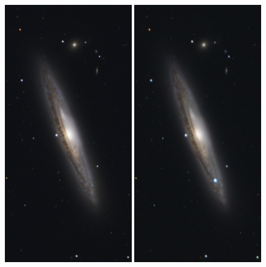 \documentclass[a4paper,oneside,12pt, class=Latex/Classes/PhDthesisPSnPDF, crop=false]{standalone}
\begin{document}
\begin{figure}
    \centering
    \includegraphics[width=0.49\textwidth]{../Images/chapter_1/SN2024gy_pre-SN.png}
    \includegraphics[width=0.49\textwidth]{../Images/chapter_1/SN2024gy_active.png}

\end{figure}
\end{document}
